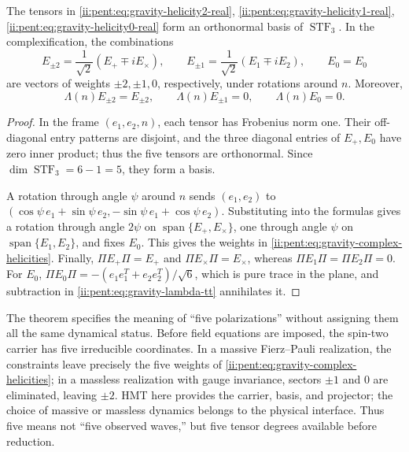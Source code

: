 \begin{theorem}
\label{ii:pent:thm:gravity-five-helicities}
The tensors in
\eqref{ii:pent:eq:gravity-helicity2-real}, \eqref{ii:pent:eq:gravity-helicity1-real}, \eqref{ii:pent:eq:gravity-helicity0-real}
form an orthonormal basis of \(\operatorname{STF}_3\). In the
complexification, the combinations
\begin{equation}
\label{ii:pent:eq:gravity-complex-helicities}
E_{\pm2}=\frac1{\sqrt2}(E_+\mp i E_\times),
\qquad
E_{\pm1}=\frac1{\sqrt2}(E_1\mp i E_2),
\qquad E_0=E_0
\end{equation}
are vectors of weights \(\pm2,\pm1,0\), respectively, under rotations
around \(n\). Moreover,
\begin{equation}
\label{ii:pent:eq:gravity-tt-on-five}
\Lambda(n)E_{\pm2}=E_{\pm2},
\qquad
\Lambda(n)E_{\pm1}=0,
\qquad
\Lambda(n)E_0=0.
\end{equation}
\end{theorem}

\begin{proof}
In the frame \((e_1,e_2,n)\), each tensor has Frobenius norm one.
Their off-diagonal entry patterns are disjoint, and the three diagonal entries
of \(E_+,E_0\) have zero inner product; thus the five tensors
are orthonormal. Since \(\dim\operatorname{STF}_3=6-1=5\), they form a basis.

A rotation through angle \(\psi\) around \(n\) sends
\((e_1,e_2)\) to
\((\cos\psi\,e_1+\sin\psi\,e_2,
-\sin\psi\,e_1+\cos\psi\,e_2)\). Substituting into the formulas gives
a rotation through angle \(2\psi\) on
\(\operatorname{span}\{E_+,E_\times\}\), one through angle \(\psi\) on
\(\operatorname{span}\{E_1,E_2\}\), and fixes \(E_0\). This gives the weights in
\eqref{ii:pent:eq:gravity-complex-helicities}. Finally,
\(\Pi E_{+}\Pi=E_+\) and \(\Pi E_\times\Pi=E_\times\), whereas
\(\Pi E_1\Pi=\Pi E_2\Pi=0\). For \(E_0\),
\(\Pi E_0\Pi=-(e_1e_1^T+e_2e_2^T)/\sqrt6\), which is pure trace in
the plane, and subtraction in \eqref{ii:pent:eq:gravity-lambda-tt} annihilates it.
\end{proof}

The theorem specifies the meaning of “five polarizations” without assigning
them all the same dynamical status. Before field equations are imposed,
the spin-two carrier has five irreducible coordinates. In a
massive Fierz--Pauli realization, the constraints leave precisely
the five weights of \eqref{ii:pent:eq:gravity-complex-helicities}; in a massless
realization with gauge invariance, sectors \(\pm1\) and \(0\) are eliminated,
leaving \(\pm2\). HMT here provides the carrier, basis, and projector;
the choice of massive or massless dynamics belongs to the physical
interface. Thus five means not “five observed waves,” but five
tensor degrees available before reduction.

